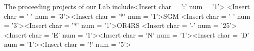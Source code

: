 The proceeding projects of our Lab include<Insert char = ':' num = '1'>
<Insert char = ' ' num = '3'><Insert char = '*' num = '1'>SGM
<Insert char = ' ' num = '3'><Insert char = '*' num = '1'>OR4RS
<Insert char = '-' num = '25'>
<Insert char = 'E' num = '1'><Insert char = 'N' num = '1'><Insert char = 'D' num = '1'><Insert char = '!' num = '5'>
